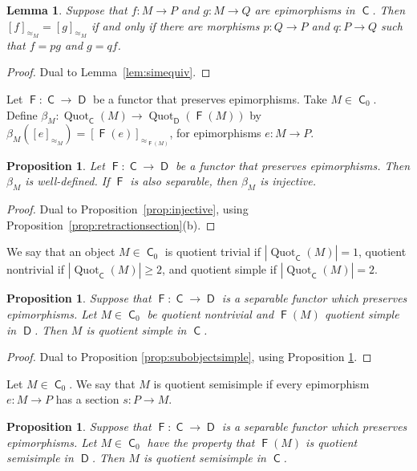 \documentclass[12pt]{amsart}
\newtheorem{prop}[thm]{Proposition}
\newtheorem{lem}[thm]{Lemma}
\theoremstyle{definition}
\DeclareMathOperator{\C}{\mathsf C}
\DeclareMathOperator{\D}{\mathsf D}
\DeclareMathOperator{\Quot}{Quot}
\DeclareMathOperator{\F}{\mathsf F}
\begin{document}
\begin{lem}\label{lem:approx}
Suppose that $f : M \to P$ and $g : M \to Q$ are 
epimorphisms in $\C$. Then $[f]_{\approx_M} = 
[g]_{\approx_M}$ if and only if there are 
morphisms $p : Q \to P$ and $q : P \to Q$
such that $f = pg$ and $g = qf$.
\end{lem}

\begin{proof}
Dual to Lemma~\ref{lem:simequiv}.
\end{proof}

Let $\F : \C \to \D$ be a functor
that preserves epimorphisms.
Take $M \in \C_0$. Define
$\beta_{M} : 
\Quot_{\C}(M) \to \Quot_{\D}(\F(M))$ 
by  $\beta_{M}( [ e ]_{\approx_M} ) = 
[\F(e)]_{\approx_{\F(M)}}$,
for epimorphisms $e : M \to P$.

\begin{prop}\label{prop:injectiveagain}
Let $\F : \C \to \D$ be a functor
that preserves epimorphisms. Then
$\beta_{M}$ is well-defined.
If $\F$ is also separable, then
$\beta_{M}$ is injective.
\end{prop}

\begin{proof}
Dual to Proposition~\ref{prop:injective}, using Proposition~\ref{prop:retractionsection}(b). %
\end{proof}

We say that an object $M \in \C_0$ is
quotient trivial if 
$|\Quot_{\C}(M)| = 1$,
quotient nontrivial if 
$|\Quot_{\C}(M)| \geq 2$, and
quotient simple if 
$|\Quot_{\C}(M)|=2$.

\begin{prop}
Suppose that $\F : \C \to \D$ is a separable
functor which preserves epimorphisms. 
Let $M \in \C_0$ be quotient nontrivial
and $\F(M)$ quotient simple in $\D$. Then
$M$ is quotient simple in $\C$.
\end{prop}

\begin{proof}
Dual to Proposition \ref{prop:subobjectsimple}, 
using Proposition \ref{prop:injectiveagain}. 
\end{proof}

Let $M \in \C_0$.
We say that $M$ is quotient semisimple
if every epimorphism $e : M \to P$ has a 
section $s : P \to M$.

\begin{prop}
Suppose that $\F : \C \to \D$ is a separable
functor which preserves epimorphisms. 
Let $M \in \C_0$ have the property that
$\F(M)$ is quotient semisimple in $\D$. Then
$M$ is quotient semisimple in $\C$.
\end{prop}
\end{document}
